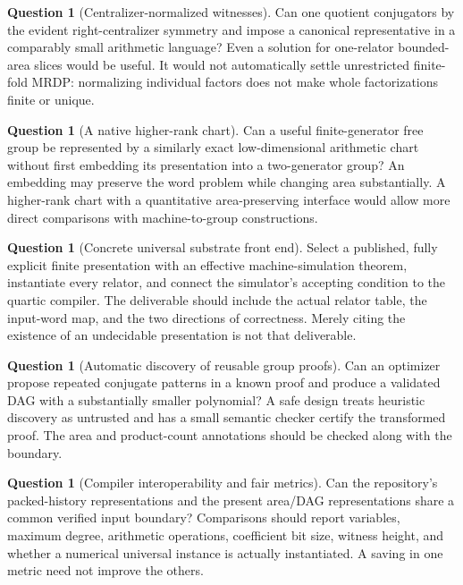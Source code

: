 \documentclass[11pt,letterpaper]{article}
\theoremstyle{definition}
\newtheorem{question}[theorem]{Question}
\theoremstyle{remark}
\begin{document}
\begin{question}[Centralizer-normalized witnesses]\label{gts:vk:q:centralizer}
Can one quotient conjugators by the evident right-centralizer symmetry and impose a canonical representative in a comparably small arithmetic language? Even a solution for one-relator bounded-area slices would be useful. It would not automatically settle unrestricted finite-fold MRDP: normalizing individual factors does not make whole factorizations finite or unique.
\end{question}

\begin{question}[A native higher-rank chart]\label{gts:vk:q:higher-rank}
Can a useful finite-generator free group be represented by a similarly exact low-dimensional arithmetic chart without first embedding its presentation into a two-generator group? An embedding may preserve the word problem while changing area substantially. A higher-rank chart with a quantitative area-preserving interface would allow more direct comparisons with machine-to-group constructions.
\end{question}

\begin{question}[Concrete universal substrate front end]\label{gts:vk:q:front-end}
Select a published, fully explicit finite presentation with an effective machine-simulation theorem, instantiate every relator, and connect the simulator's accepting condition to the quartic compiler. The deliverable should include the actual relator table, the input-word map, and the two directions of correctness. Merely citing the existence of an undecidable presentation is not that deliverable.
\end{question}

\begin{question}[Automatic discovery of reusable group proofs]\label{gts:vk:q:discovery}
Can an optimizer propose repeated conjugate patterns in a known proof and produce a validated DAG with a substantially smaller polynomial? A safe design treats heuristic discovery as untrusted and has a small semantic checker certify the transformed proof. The area and product-count annotations should be checked along with the boundary.
\end{question}

\begin{question}[Compiler interoperability and fair metrics]\label{gts:vk:q:interop}
Can the repository's packed-history representations and the present area/DAG representations share a common verified input boundary? Comparisons should report variables, maximum degree, arithmetic operations, coefficient bit size, witness height, and whether a numerical universal instance is actually instantiated. A saving in one metric need not improve the others.
\end{question}
\end{document}
